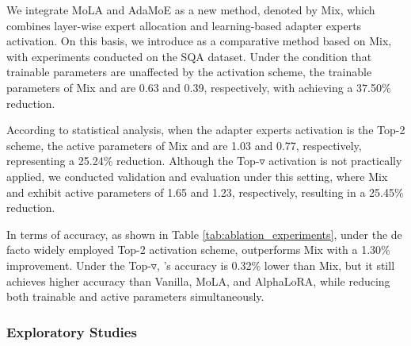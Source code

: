 We integrate MoLA and AdaMoE as a new method,  denoted by Mix, which combines layer-wise expert allocation and learning-based adapter experts activation. On this basis, we introduce \name as a comparative method based on Mix, with experiments conducted on the SQA dataset. Under the condition that trainable parameters are unaffected by the activation scheme, the trainable parameters of Mix and \name are 0.63 and 0.39, respectively, with \name achieving a 37.50\% reduction. 

According to statistical analysis, when the adapter experts activation is the Top-2 scheme, the active parameters of Mix and \name are 1.03 and 0.77, respectively, representing a 25.24\% reduction. Although the Top-$\triangledown$ activation is not practically applied, we conducted validation and evaluation under this setting, where Mix and \name exhibit active parameters of 1.65 and 1.23, respectively, resulting in a 25.45\% reduction. 

In terms of accuracy, as shown in Table \ref{tab:ablation_experiments}, under the de facto widely employed Top-2 activation scheme, \name outperforms Mix with a 1.30\% improvement. Under the Top-$\triangledown$, \name’s accuracy is 0.32\% lower than Mix, but it still achieves higher accuracy than Vanilla, MoLA, and AlphaLoRA, while reducing both trainable and active parameters simultaneously.

\subsubsection{Exploratory Studies}

